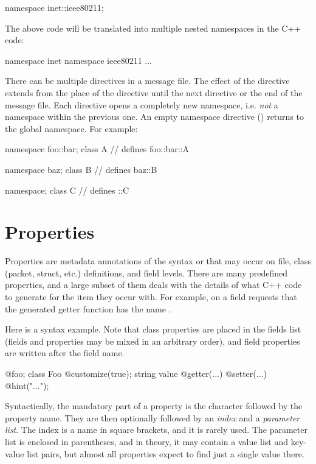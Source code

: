 \begin{msg}
namespace inet::ieee80211;
\end{msg}

The above code will be translated into multiple nested namespaces in the C++ code:

\begin{cpp}
namespace inet { namespace ieee80211 {
...
}}
\end{cpp}

There can be multiple  directives in a message file. The
effect of the  directive extends from the place of the
directive until the next  directive or the end of the
message file. Each  directive opens a completely new
namespace, i.e. \textit{not} a namespace within the previous one. An empty
namespace directive () returns to the global namespace. For
example:

\begin{msg}
namespace foo::bar;
class A {}  // defines foo::bar::A

namespace baz;
class B {}  // defines baz::B

namespace;
class C {}  // defines ::C
\end{msg}


\section{Properties}
\label{sec:msg-defs:properties}

Properties are metadata annotations of the syntax  or
 that may occur on file, class (packet, struct, etc.)
definitions, and field levels. There are many predefined properties, and a
large subset of them deals with the details of what C++ code to generate for the
item they occur with. For example,  on a field requests
that the generated getter function has the name .

Here is a syntax example. Note that class properties are placed in the fields
list (fields and properties may be mixed in an arbitrary order), and field
properties are written after the field name.

\begin{msg}
@foo;
class Foo {
  @customize(true);
  string value @getter(...) @setter(...) @hint("...");
}
\end{msg}

Syntactically, the mandatory part of a property is the  character
followed by the property name. They are then optionally followed by an
\textit{index} and a \textit{parameter list}. The index is a name in square
brackets, and it is rarely used. The parameter list is enclosed in parentheses,
and in theory, it may contain a value list and key-value list pairs, but
almost all properties expect to find just a single value there.

